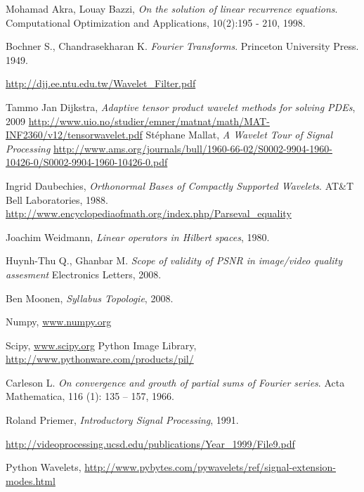 \documentclass[11pt]{uvamath}
\theoremstyle{plain}
\theoremstyle{definition}
\theoremstyle{remark}
\begin{document}




\begin{thebibliography}{11}

  Mohamad Akra,  Louay Bazzi,
  \emph{On the solution of linear recurrence equations}.
  Computational Optimization and Applications,
  10(2):195 - 210,
  1998.

  Bochner S., Chandrasekharan K.
  \emph{Fourier Transforms}.
  Princeton University Press.
  1949.

  \url{http://djj.ee.ntu.edu.tw/Wavelet_Filter.pdf}

  Tammo Jan Dijkstra,
  \emph{Adaptive tensor product wavelet methods for solving PDEs}, 2009
  \url{http://www.uio.no/studier/emner/matnat/math/MAT-INF2360/v12/tensorwavelet.pdf}
  St\'ephane Mallat,
  \emph{A Wavelet Tour of Signal Processing}
  \url{http://www.ams.org/journals/bull/1960-66-02/S0002-9904-1960-10426-0/S0002-9904-1960-10426-0.pdf}

  Ingrid Daubechies, \emph{Orthonormal Bases of Compactly Supported Wavelets}.
  AT\&T Bell Laboratories, 1988.
  \url{http://www.encyclopediaofmath.org/index.php/Parseval_equality}

Joachim Weidmann, \emph{Linear operators in Hilbert spaces}, 1980.

  Huynh-Thu Q., Ghanbar M.
  \emph{Scope of validity of PSNR in image/video quality assesment}
  Electronics Letters, 2008.

  Ben Moonen, \emph{Syllabus Topologie}, 2008.

	Numpy, \url{www.numpy.org}
	
	Scipy, \url{www.scipy.org}
	Python Image Library, \url{http://www.pythonware.com/products/pil/}

  Carleson L.
  \emph{On convergence and growth of partial sums of Fourier series}. 
  Acta Mathematica,
  116 (1): 135 – 157,
  1966.

Roland Priemer, \emph{Introductory Signal Processing}, 1991. 

\url{http://videoprocessing.ucsd.edu/publications/Year_1999/File9.pdf}

	Python Wavelets, \url{http://www.pybytes.com/pywavelets/ref/signal-extension-modes.html}

\end{thebibliography}
\end{document}
